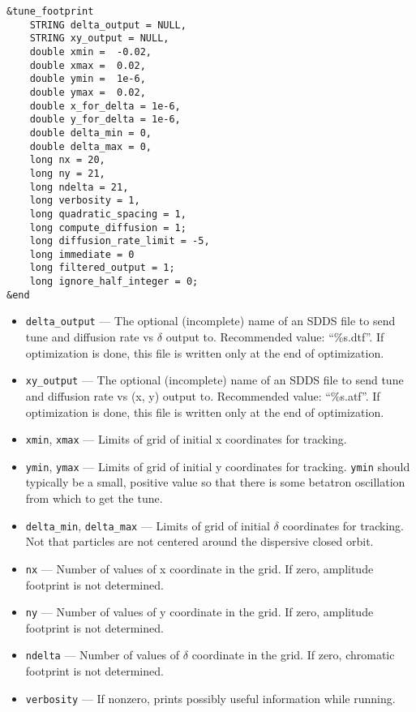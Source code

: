 \documentclass[11pt]{article}
\begin{document}
\begin{verbatim}
&tune_footprint
    STRING delta_output = NULL,
    STRING xy_output = NULL,
    double xmin =  -0.02,
    double xmax =  0.02,
    double ymin =  1e-6,
    double ymax =  0.02,
    double x_for_delta = 1e-6,
    double y_for_delta = 1e-6,
    double delta_min = 0,
    double delta_max = 0,
    long nx = 20,
    long ny = 21,
    long ndelta = 21,
    long verbosity = 1,
    long quadratic_spacing = 1,
    long compute_diffusion = 1;
    long diffusion_rate_limit = -5,
    long immediate = 0
    long filtered_output = 1;
    long ignore_half_integer = 0;
&end
\end{verbatim}

\begin{itemize}
\item \verb|delta_output| --- The optional (incomplete) name of an SDDS file to send tune and diffusion rate vs $\delta$ output to.  
 Recommended value: ``\%s.dtf''.  If optimization is done, this file is written only at the end of optimization.
\item \verb|xy_output| --- The optional (incomplete) name of an SDDS file to send tune and diffusion rate vs (x, y) output to.  
 Recommended value: ``\%s.atf''.  If optimization is done, this file is written only at the end of optimization.
\item \verb|xmin|, \verb|xmax| --- Limits of grid of initial x coordinates for tracking.             
\item \verb|ymin|, \verb|ymax| --- Limits of grid of initial y coordinates for tracking.             
 \verb|ymin| should typically be a small, positive value so that there                               
 is some betatron oscillation from which to get the tune.                      
\item \verb|delta_min|, \verb|delta_max| --- Limits of grid of initial $\delta$ coordinates
for tracking.  Not that particles are not centered around the dispersive closed orbit.
\item \verb|nx| --- Number of values of x coordinate in the grid. If zero, amplitude footprint is not determined.
\item \verb|ny| --- Number of values of y coordinate in the grid. If zero, amplitude footprint is not determined.
\item \verb|ndelta| --- Number of values of $\delta$ coordinate in the grid. If zero, chromatic footprint is not determined.
\item \verb|verbosity| --- If nonzero, prints possibly useful information while running.

\end{itemize}
\end{document}
